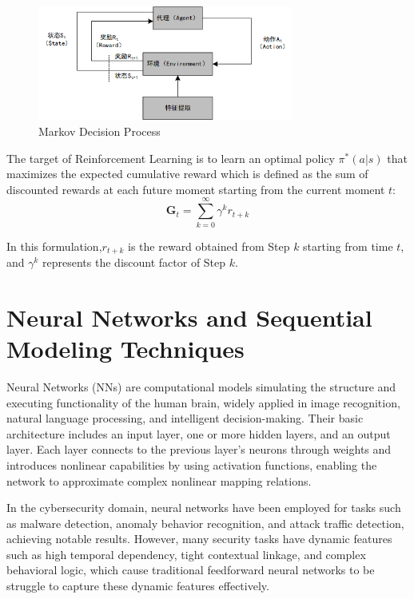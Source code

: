 \begin{figure}[hbt]
	\centering
	\includegraphics[width=0.75\textwidth]{figures/2.3}
	\caption{Markov Decision Process}\label{fig:2.3}
\end{figure}

The target of Reinforcement Learning is to learn an optimal policy $\pi^{*}(a|s)$ that maximizes the expected cumulative reward which is defined as the sum of discounted rewards at each future moment starting from the current moment $t$:
\begin{equation}
	\label{eq:reward}
	\boldsymbol{G}_t = \sum_{k=0}^{\infty} \gamma^k r_{t+k}
\end{equation}

In this formulation,\( r_{t+k} \) is the reward obtained from Step \( k \) starting from time \( t \), and \( \gamma^k \) represents the discount factor of Step \( k \).

\section{Neural Networks and Sequential Modeling Techniques}

Neural Networks (NNs) are computational models simulating the structure and executing functionality of the human brain, widely applied in image recognition, natural language processing, and intelligent decision-making. Their basic architecture includes an input layer, one or more hidden layers, and an output layer. Each layer connects to the previous layer's neurons through weights and introduces nonlinear capabilities by using activation functions, enabling the network to approximate complex nonlinear mapping relations.

In the cybersecurity domain, neural networks have been employed for tasks such as malware detection, anomaly behavior recognition, and attack traffic detection, achieving notable results. However, many security tasks have dynamic features such as high temporal dependency, tight contextual linkage, and complex behavioral logic, which cause traditional feedforward neural networks to be struggle to capture these dynamic features effectively.

